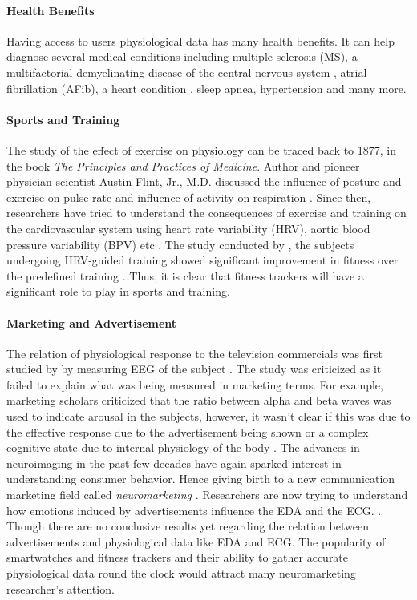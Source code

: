 \paragraph{Health Benefits} Having access to users physiological data has many health benefits. It can help diagnose several medical conditions including multiple sclerosis (MS), a multifactorial demyelinating disease of the central nervous system \cite{sparaco_role_2018}, atrial fibrillation (AFib), a heart condition \cite{nemati_monitoring_2016}, sleep apnea, hypertension \cite{tison_geoffrey_h_abstract_2017} and many more.

\paragraph{Sports and Training} The study of the effect of exercise on physiology can be traced back to 1877, in the book \textit{The Principles and Practices of Medicine}. Author and pioneer physician-scientist Austin Flint, Jr., M.D. discussed the influence of posture and exercise on pulse rate and influence of activity on respiration \cite{mcardle_essentials_2006}. Since then, researchers have tried to understand the consequences of exercise and training on the cardiovascular system using heart rate variability (HRV), aortic blood pressure variability (BPV) etc \cite{aubert_heart_2003}. The study conducted by \citeauthor{vesterinen_individual_2016}, the subjects undergoing HRV-guided training showed significant improvement in fitness over the predefined training \cite{vesterinen_individual_2016}. Thus, it is clear that fitness trackers will have a significant role to play in sports and training.

\paragraph{Marketing and Advertisement} The relation of physiological response to the television commercials was first studied by \citeauthor{522761019710201} by measuring EEG of the subject \cite{522761019710201}. The study was criticized as it failed to explain what was being measured in marketing terms. For example, marketing scholars criticized that the ratio between alpha and beta waves was used to indicate arousal in the subjects, however, it wasn't clear if this was due to the effective response due to the advertisement being shown or a complex cognitive state due to internal physiology of the body \cite{1907543419840330}. The advances in neuroimaging in the past few decades have again sparked interest in understanding consumer behavior. Hence giving birth to a new communication marketing field called \textit{neuromarketing} \cite{ait_hammou_contributions_2013}. Researchers are now trying to understand how emotions induced by advertisements influence the EDA and the ECG. \cite{baraybar-fernandez_evaluation_2017}. Though there are no conclusive results yet regarding the relation between advertisements and physiological data like EDA and ECG. The popularity of smartwatches and fitness trackers and their ability to gather accurate physiological data round the clock would attract many neuromarketing researcher's attention.


